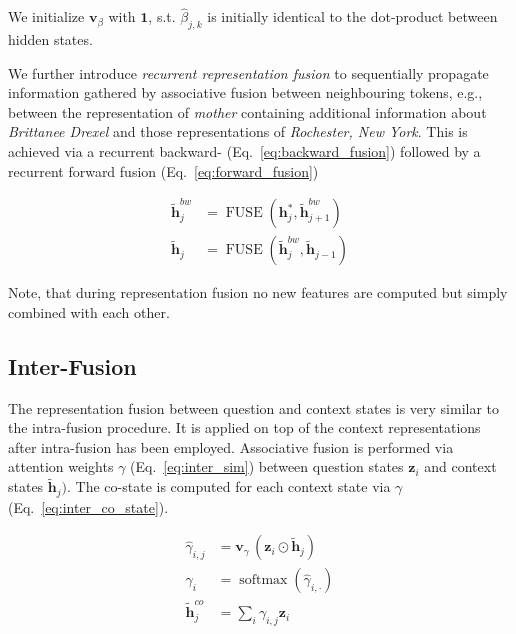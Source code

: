 \documentclass[11pt,a4paper]{article}
\begin{document}
We initialize $\boldsymbol{v}_{\beta}$ with $\boldsymbol{1}$, s.t. $\hat{\beta}_{j,k}$ is initially identical to the dot-product between hidden states.

We further introduce \textit{recurrent representation fusion} to sequentially propagate information gathered by associative fusion between neighbouring tokens, e.g., between the representation of \textit{mother} containing additional information about \textit{Brittanee Drexel} and those representations of \textit{Rochester, New York}. This is achieved via a recurrent backward- (Eq.~\ref{eq:backward_fusion}) followed by a recurrent forward fusion (Eq.~\ref{eq:forward_fusion}) 

\begin{align}
    \boldsymbol{\tilde{h}}^{bw}_j &= \operatorname{FUSE}(\boldsymbol{h}^\ast_j, \boldsymbol{\tilde{h}}^{bw}_{j+1}) \label{eq:backward_fusion} \\
    \boldsymbol{\tilde{h}}_j &= \operatorname{FUSE}(\boldsymbol{\tilde{h}}^{bw}_j, \boldsymbol{\tilde{h}}_{j-1})
    \label{eq:forward_fusion}
\end{align}

Note, that during representation fusion no new features are computed but simply combined with each other. 

\subsection{Inter-Fusion}

The representation fusion between question and context states is very similar to the intra-fusion procedure. It is applied on top of the context representations after intra-fusion has been employed. Associative fusion is performed via attention weights $\gamma$ (Eq.~\ref{eq:inter_sim}) between question states $\boldsymbol{z}_i$ and context states $\boldsymbol{\tilde{h}}_j)$. The co-state is computed for each context state via $\gamma$ (Eq.~\ref{eq:inter_co_state}).

\begin{align}
    \hat{\gamma}_{i,j} &= \boldsymbol{v}_{\gamma} \, ( \boldsymbol{z}_i \odot \boldsymbol{\tilde{h}}_j ) \nonumber \\
    \gamma_i &= \operatorname{softmax}(\hat{\gamma}_{i,\cdot}) \label{eq:inter_sim} \\
    \boldsymbol{\tilde{h}}_j^{co} &= \sum_i \gamma_{i,j}  \boldsymbol{z}_i  \label{eq:inter_co_state}
\end{align}
\end{document}
